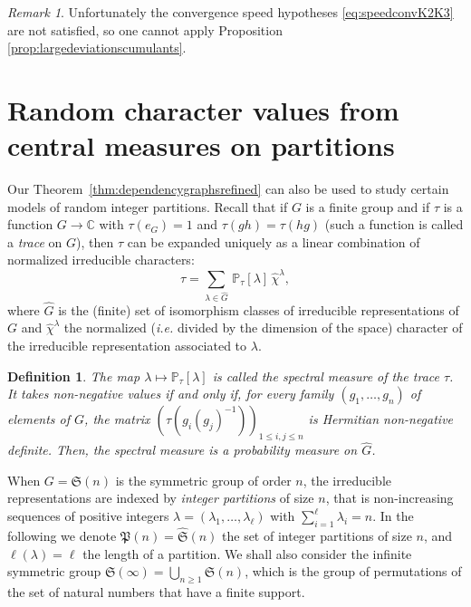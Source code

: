 \documentclass[12pt,a4paper,reqno]{amsart}
\newtheorem{definition}[lemma]{Definition}
\theoremstyle{remark}
\newtheorem{remark}[lemma]{Remark}
\newcommand{\C}{\mathbb{C}}
\newcommand{\proba}{\mathbb{P}}
\newcommand{\sym}{\mathfrak{S}}
\newcommand{\pym}{\mathfrak{P}}
\begin{document}
\begin{remark}
Unfortunately the convergence speed hypotheses \eqref{eq:speedconvK2K3} are not satisfied, so one cannot apply Proposition \ref{prop:largedeviationscumulants}.
\end{remark}
\bigskip
\bigskip



















\section{Random character values from central measures on partitions}\label{sec:central}
Our Theorem~\ref{thm:dependencygraphsrefined} can also be used to study certain models of random integer partitions. Recall that if $G$ is a finite group and if $\tau$ is a function $G \to \C$ with $\tau(e_{G})=1$ and $\tau(gh)=\tau(hg)$ (such a function is called a \emph{trace} on $G$), then $\tau$ can be expanded uniquely as a linear combination of normalized irreducible characters:
$$\tau=\sum_{\lambda \in \widehat{G}} \,\proba_{\tau}[\lambda]\,\widehat{\chi}^{\lambda},$$
where $\widehat{G}$ is the (finite) set of isomorphism classes of irreducible representations of $G$ and $\widehat{\chi}^{\lambda}$ the normalized ({\em i.e.} divided by the dimension of the space)
character of the irreducible representation associated to $\lambda$.
\begin{definition}
The map $\lambda \mapsto \proba_{\tau}[\lambda]$ is called the spectral measure of the trace $\tau$. It takes non-negative values if and only if, for every family $(g_1,\ldots,g_n)$ of elements of $G$, the matrix $(\tau(g_i(g_j)^{-1}))_{1 \leq i,j \leq n}$ is Hermitian non-negative definite. Then, the spectral measure is a probability measure on $\widehat{G}$.
\end{definition}
\bigskip

When $G=\sym(n)$ is the symmetric group of order $n$, the irreducible representations are indexed by \emph{integer partitions} of size $n$, that is non-increasing sequences of positive integers $\lambda=(\lambda_{1},\ldots,\lambda_{\ell})$ with $\sum_{i=1}^{\ell}\lambda_{i}=n$. In the following we denote $\pym(n)=\widehat{\sym}(n)$ the set of integer partitions of size $n$, and $\ell(\lambda)=\ell$ the length of a partition. We shall also consider the infinite symmetric group $\sym(\infty)=\bigcup_{n \ge 1} \sym(n)$, which is the group of permutations of the set of natural numbers that have a finite support.
\end{document}

